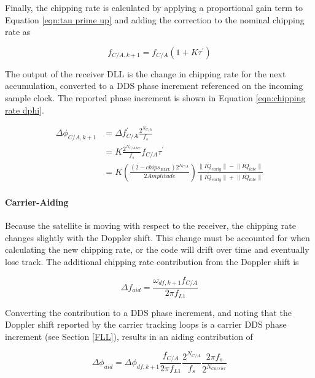 \documentclass[12pt]{article}
\begin{document}
Finally, the chipping rate is calculated by applying a proportional gain term to Equation \ref{eqn:tau prime up} and adding the correction to the nominal chipping rate as

\begin{equation*}
f_{C/A,k+1} = f_{C/A}(1+K \tau^\prime)
\end{equation*}

The output of the receiver DLL is the change in chipping rate for the next accumulation, converted to a DDS phase increment referenced on the incoming sample clock. The reported phase increment is shown in Equation \ref{eqn:chipping rate dphi}.

\begin{align}
\label{eqn:chipping rate dphi}
\Delta\phi_{C/A,k+1} &= \Delta f_{C/A}^\prime \frac{2^{N_{C/A}}}{f_s} \nonumber \\
&= K \frac{2^{N_{C/A Acc}}}{f_s} f_{C/A} \tau^\prime \nonumber \\
&= K \left( \frac{(2-chips_{EML}) 2^{N_{C/A}}}{2 Amplitude} \right) \frac{\lVert \overline{IQ}_{early} \rVert - \lVert \overline{IQ}_{late} \rVert}{\lVert \overline{IQ}_{early} \rVert + \lVert \overline{IQ}_{late} \rVert}
\end{align}

\paragraph{Carrier-Aiding}
Because the satellite is moving with respect to the receiver, the chipping rate changes slightly with the Doppler shift. This change must be accounted for when calculating the new chipping rate, or the code will drift over time and eventually lose track. The additional chipping rate contribution from the Doppler shift is

\begin{equation*}
\Delta f_{aid} = \frac{\omega_{df,k+1} f_{C/A}}{2 \pi f_{L1}}
\end{equation*}

Converting the contribution to a DDS phase increment, and noting that the Doppler shift reported by the carrier tracking loops is a carrier DDS phase increment (see Section \ref{FLL}), results in an aiding contribution of

\begin{equation*}
\Delta \phi_{aid} = \Delta\phi_{df,k+1} \frac{f_{C/A}}{2 \pi f_{L1}} \frac{2^{N_{C/A}}}{f_s} \frac{2 \pi f_s}{2^{N_{Carrier}}}
\end{equation*}
\end{document}

